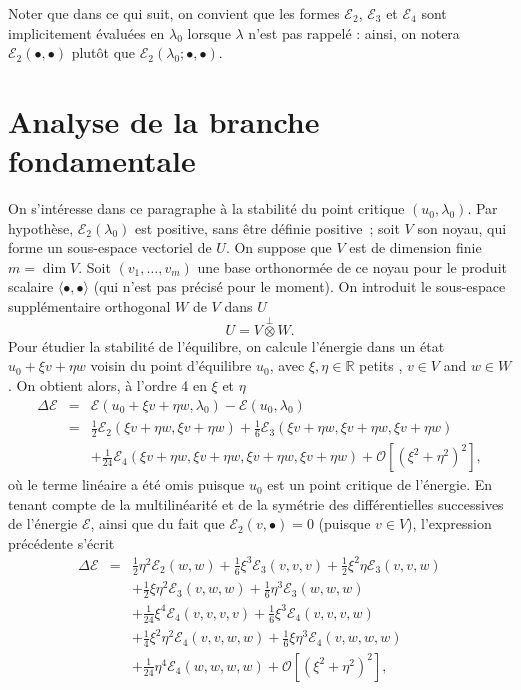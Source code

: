 \documentclass[12pt, final]{amsart}
\begin{document}
Noter que dans ce qui suit, on convient que les formes $\mathcal{E}_2$,
$\mathcal{E}_3$ et $\mathcal{E}_4$ sont implicitement évaluées en
$\lambda_0$ lorsque $\lambda$ n'est pas rappelé : ainsi, on notera
$\mathcal{E}_2 (\bullet, \bullet)$ plut{\^o}t que $\mathcal{E}_2 (\lambda_0 ;
\bullet, \bullet)$.

\section{Analyse de la branche fondamentale}

On s'intéresse dans ce paragraphe à la stabilité du point critique
$(u_0, \lambda_0) .$ Par hypothèse, $\mathcal{E}_2 (\lambda_0)$ est
positive, sans {\^e}tre définie positive~; soit $V$ son noyau, qui forme
un sous-espace vectoriel de $U$. On suppose que $V$ est de dimension finie $m
= \dim V$. Soit $(v_1, \ldots, v_m)$ une base orthonormée de ce noyau pour
le produit scalaire $\langle \bullet, \bullet \rangle$ (qui n'est pas
précisé pour le moment). On introduit le sous-espace
supplémentaire orthogonal $W$ de $V$ dans $U$
\begin{equation}
  U = V \overset{\perp}{\otimes} W.
\end{equation}
Pour étudier la stabilité de l'équilibre, on calcule l'énergie
dans un état $u_0 + \xi v + \eta w$ voisin du point d'équilibre $u_0$,
avec $\xi, \eta \in \mathbb{R}$ {\guillemotleft} petits {\guillemotright}, $v
\in V$ and $w \in W$. On obtient alors, à l'ordre 4 en $\xi$ et $\eta$
\begin{eqnarray}
  \Delta \mathcal{E} & = & \mathcal{E} (u_0 + \xi v + \eta w, \lambda_0)
  -\mathcal{E} (u_0, \lambda_0) \nonumber\\
  & = & \tfrac{1}{2} \mathcal{E}_2 (\xi v + \eta w, \xi v + \eta w) +
  \tfrac{1}{6} \mathcal{E}_3 (\xi v + \eta w, \xi v + \eta w, \xi v + \eta w)
  \nonumber\\
  &  &  + \tfrac{1}{24} \mathcal{E}_4 (\xi v + \eta w, \xi v + \eta
  w, \xi v + \eta w, \xi v + \eta w) +\mathcal{O} [(\xi^2 + \eta^2)^2],
\end{eqnarray}
où le terme linéaire a été omis puisque $u_0$ est un point
critique de l'énergie. En tenant compte de la multilinéarité et de
la symétrie des différentielles successives de l'énergie
$\mathcal{E}$, ainsi que du fait que $\mathcal{E}_2 (v, \bullet) = 0$ (puisque
$v \in V$), l'expression précédente s'écrit
\begin{eqnarray}
  \Delta \mathcal{E} & = & \tfrac{1}{2} \eta^2 \mathcal{E}_2 (w, w) +
  \tfrac{1}{6} \xi^3 \mathcal{E}_3 (v, v, v) + \tfrac{1}{2} \xi^2 \eta
  \mathcal{E}_3 (v, v, w) \nonumber\\
  &  & + \tfrac{1}{2} \xi \eta^2 \mathcal{E}_3 (v, w, w) + \tfrac{1}{6}
  \eta^3 \mathcal{E}_3 (w, w, w) \nonumber\\
  &  & + \tfrac{1}{24} \xi^4 \mathcal{E}_4 (v, v, v, v) + \tfrac{1}{6} \xi^3
  \mathcal{E}_4 (v, v, v, w) \nonumber\\
  &  & + \tfrac{1}{4} \xi^2 \eta^2 \mathcal{E}_4 (v, v, w, w) + \tfrac{1}{6}
  \xi \eta^3 \mathcal{E}_4 (v, w, w, w) \nonumber\\
  &  & + \tfrac{1}{24} \eta^4 \mathcal{E}_4 (w, w, w, w) +\mathcal{O} [(\xi^2
  + \eta^2)^2],
\end{eqnarray}
\end{document}
